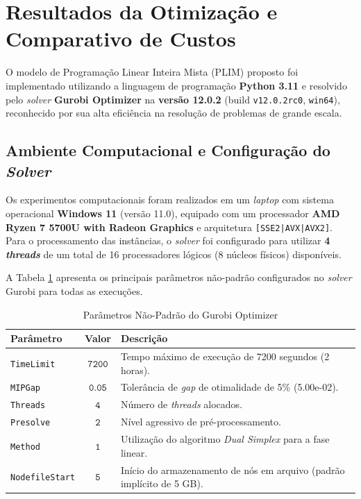 \section[Resultados da Otimização e Comparativo de Custos]{Resultados da Otimização e Comparativo de Custos}

O modelo de Programação Linear Inteira Mista (PLIM) proposto foi implementado utilizando a linguagem de programação \textbf{Python 3.11} e resolvido pelo \emph{solver} \textbf{Gurobi Optimizer} na \textbf{versão 12.0.2} (build \texttt{v12.0.2rc0}, \texttt{win64}), reconhecido por sua alta eficiência na resolução de problemas de grande escala.

\subsection{Ambiente Computacional e Configuração do \emph{Solver}}

Os experimentos computacionais foram realizados em um \emph{laptop} com sistema operacional \textbf{Windows 11} (versão 11.0), equipado com um processador \textbf{AMD Ryzen 7 5700U with Radeon Graphics} e arquitetura \texttt{[SSE2|AVX|AVX2]}. Para o processamento das instâncias, o \emph{solver} foi configurado para utilizar \textbf{4 \emph{threads}} de um total de 16 processadores lógicos (8 núcleos físicos) disponíveis.

A Tabela \ref{tab:parametros_gurobi} apresenta os principais parâmetros não-padrão configurados no \emph{solver} Gurobi para todas as execuções.

\begin{table}[htb]
    \centering
    \caption{Parâmetros Não-Padrão do Gurobi Optimizer}
    \label{tab:parametros_gurobi}
    \begin{tabular}{lcl}
        \toprule
        \textbf{Parâmetro} & \textbf{Valor} & \textbf{Descrição} \\
        \midrule
        \texttt{TimeLimit} & $\texttt{7200}$ & Tempo máximo de execução de 7200 segundos (2 horas). \\
        \texttt{MIPGap} & $\texttt{0.05}$ & Tolerância de \emph{gap} de otimalidade de 5\% (5.00e-02). \\
        \texttt{Threads} & $\texttt{4}$ & Número de \emph{threads} alocados. \\
        \texttt{Presolve} & $\texttt{2}$ & Nível agressivo de pré-processamento. \\
        \texttt{Method} & $\texttt{1}$ & Utilização do algoritmo \emph{Dual Simplex} para a fase linear. \\
        \texttt{NodefileStart} & $\texttt{5}$ & Início do armazenamento de nós em arquivo (padrão implícito de 5 GB). \\
        \bottomrule
    \end{tabular}
\end{table}

